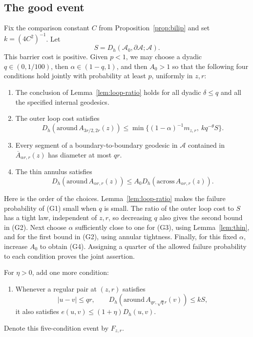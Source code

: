 \documentclass[11pt]{article}
\theoremstyle{definition}
\theoremstyle{remark}
\begin{document}
\subsection{The good event}
Fix the comparison constant $C$ from Proposition~\ref{prop:bilip}
and set $k=(4C^2)^{-1}$. Let
\[
       S=D_h(\mathcal A_0,\partial\mathcal A;\mathcal A).
\]
This barrier cost is positive. Given $p<1$, we may choose a
dyadic $q\in(0,1/100)$, then $\alpha\in(1-q,1)$, and then
$A_0>1$ so that the following four conditions hold jointly with
probability at least $p$, uniformly in $z,r$:
\begin{enumerate}[label=\textup{(G\arabic*)}]
\item The conclusion of Lemma~\ref{lem:loop-ratio} holds for all
dyadic $\delta\le q$ and all the specified internal geodesics.
\item The outer loop cost satisfies
\begin{equation}\label{eq:G2}
 D_h(\mathrm{around}\,A_{3r/2,2r}(z))
       \le\min\{(1-\alpha)^{-1}m_{z,r},\ kq^{-\theta}S\}.
\end{equation}
\item Every segment of a boundary-to-boundary geodesic in
$\mathcal A$ contained in $\overline A_{\alpha r,r}(z)$ has
diameter at most $qr$.
\item The thin annulus satisfies
\begin{equation}\label{eq:G4}
 D_h(\mathrm{around}\,A_{\alpha r,r}(z))
        \le A_0D_h(\mathrm{across}\,A_{\alpha r,r}(z)).
\end{equation}
\end{enumerate}

Here is the order of the choices. Lemma~\ref{lem:loop-ratio}
makes the failure probability of (G1) small when $q$ is small.
The ratio of the outer loop cost to $S$ has a tight law,
independent of $z,r$, so decreasing $q$ also gives the second
bound in (G2). Next choose $\alpha$ sufficiently close to one
for (G3), using Lemma~\ref{lem:thin}, and for the first bound
in (G2), using annular tightness. Finally, for this fixed
$\alpha$, increase $A_0$ to obtain (G4). Assigning a quarter
of the allowed failure probability to each condition proves
the joint assertion.

For $\eta>0$, add one more condition:
\begin{enumerate}[label=\textup{(G\arabic*)},start=5]
\item Whenever a regular pair at $(z,r)$ satisfies
\begin{equation}\label{eq:G5-extra}
 |u-v|\le qr,\qquad
 D_h(\mathrm{around}\,A_{qr,\sqrt q r}(v))\le kS,
\end{equation}
it also satisfies $e(u,v)\le(1+\eta)D_h(u,v)$.
\end{enumerate}
Denote this five-condition event by $F_{z,r}$.
\end{document}
